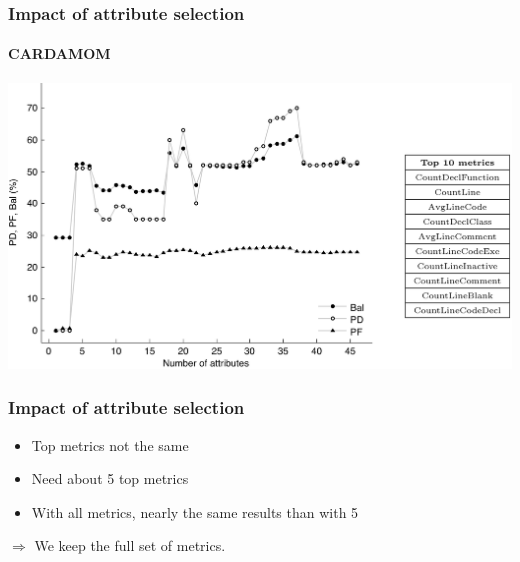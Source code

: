 \begin{frame}
 \frametitle{Impact of attribute selection}
 \framesubtitle{CARDAMOM}
 \begin{center}
  \includegraphics[width=\textwidth]{figures/attributesCardamom.png}
 \end{center}
\end{frame}

\begin{frame}
 \frametitle{Impact of attribute selection}
 \begin{itemize}
  \item Top metrics not the same
  \item Need about 5 top metrics
  \item With all metrics, nearly the same results than with 5
 \end{itemize}
 \vspace{0.5cm}
 \begin{center}
  $\Longrightarrow$ \alert{We keep the full set of metrics.}
 \end{center}
\end{frame}